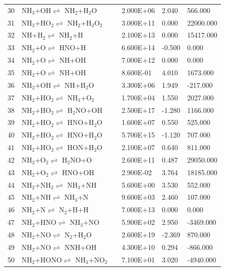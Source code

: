 \documentclass[11pt]{article}
\begin{document}
\begin{table}[hbt]
\begin{tabular}{|r l c l l l|}
30 &	NH$_{3}$+OH$\rightleftharpoons$ NH$_{2}$+H$_{2}$O&	&	2.000E+06&	2.040&	566.000\\ 
31 &	NH$_{3}$+HO$_{2}$$\rightleftharpoons$ NH$_{2}$+H$_{2}$O$_{2}$&	&	3.000E+11&	0.000&	22000.000\\ 
32 &	NH+H$_{2}$$\rightleftharpoons$ NH$_{2}$+H&	&	2.100E+13&	0.000&	15417.000\\ 
33 &	NH$_{2}$+O$\rightleftharpoons$ HNO+H&	&	6.600E+14&	-0.500&	0.000\\ 
34 &	NH$_{2}$+O$\rightleftharpoons$ NH+OH&	&	7.000E+12&	0.000&	0.000\\ 
35 &	NH$_{2}$+O$\rightleftharpoons$ NH+OH&	&	8.600E-01&	4.010&	1673.000\\ 
36 &	NH$_{2}$+OH$\rightleftharpoons$ NH+H$_{2}$O&	&	3.300E+06&	1.949&	-217.000\\ 
37 &	NH$_{2}$+HO$_{2}$$\rightleftharpoons$ NH$_{3}$+O$_{2}$&	&	1.700E+04&	1.550&	2027.000\\ 
38 &	NH$_{2}$+HO$_{2}$$\rightleftharpoons$ H$_{2}$NO+OH&	&	2.500E+17&	-1.280&	1166.000\\ 
39 &	NH$_{2}$+HO$_{2}$$\rightleftharpoons$ HNO+H$_{2}$O&	&	1.600E+07&	0.550&	525.000\\ 
40 &	NH$_{2}$+HO$_{2}$$\rightleftharpoons$ HNO+H$_{2}$O&	&	5.700E+15&	-1.120&	707.000\\ 
41 &	NH$_{2}$+HO$_{2}$$\rightleftharpoons$ HON+H$_{2}$O&	&	2.100E+07&	0.640&	811.000\\ 
42 &	NH$_{2}$+O$_{2}$$\rightleftharpoons$ H$_{2}$NO+O&	&	2.600E+11&	0.487&	29050.000\\ 
43 &	NH$_{2}$+O$_{2}$$\rightleftharpoons$ HNO+OH&	&	2.900E-02&	3.764&	18185.000\\ 
44 &	NH$_{2}$+NH$_{2}$$\rightleftharpoons$ NH$_{3}$+NH&	&	5.600E+00&	3.530&	552.000\\ 
45 &	NH$_{2}$+NH$\rightleftharpoons$ NH$_{3}$+N&	&	9.600E+03&	2.460&	107.000\\ 
46 &	NH$_{2}$+N$\rightleftharpoons$ N$_{2}$+H+H&	&	7.000E+13&	0.000&	0.000\\ 
47 &	NH$_{2}$+HNO$\rightleftharpoons$ NH$_{3}$+NO&	&	5.900E+02&	2.950&	-3469.000\\ 
48 &	NH$_{2}$+NO$\rightleftharpoons$ N$_{2}$+H$_{2}$O&	&	2.600E+19&	-2.369&	870.000\\ 
49 &	NH$_{2}$+NO$\rightleftharpoons$ NNH+OH&	&	4.300E+10&	0.294&	-866.000\\ 
50 &	NH$_{2}$+HONO$\rightleftharpoons$ NH$_{3}$+NO$_{2}$&	&	7.100E+01&	3.020&	-4940.000\\ 

\end{tabular}
\end{table}
\end{document}
